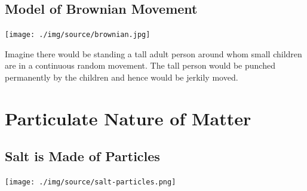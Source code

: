 \begin{multicols}{2}
\subsection{Model of Brownian Movement}

\begin{center}
\texttt{[image: ./img/source/brownian.jpg]}
\end{center}

Imagine there would be standing a tall adult person around whom small children are in a
continuous random movement. The tall person would be punched permanently by the
children and hence would be jerkily moved.


\columnbreak


\section*{Particulate Nature of Matter}


\subsection{Salt is Made of Particles}

\begin{center}
\texttt{[image: ./img/source/salt-particles.png]}
\end{center}


\end{multicols}
